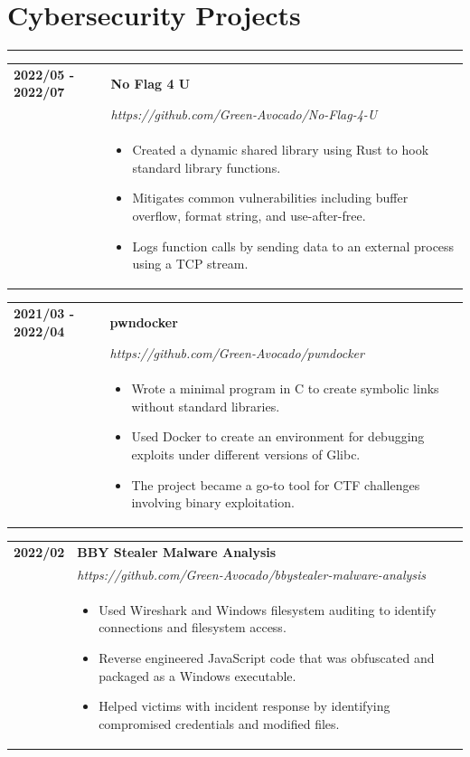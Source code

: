 \documentclass[letterpaper]{article}
\newcommand{\sectcolor}{cyan}
\newcommand{\sect}[1]{\section*{#1}
                        {\color{\sectcolor}
                        \rule{\textwidth}{1pt}
                        \vspace{-4pt}}}
\begin{document}
    \sect{Cybersecurity Projects}

        \begin{tabular}{p{} p{}}
            \textbf{2022/05 - 2022/07} & \textbf{No Flag 4 U} \\
            & \emph{https://github.com/Green-Avocado/No-Flag-4-U} \\
            & \begin{itemize}
                \item Created a dynamic shared library using Rust to hook standard library functions.
                \item Mitigates common vulnerabilities including buffer overflow, format string, and
                    use-after-free.
                \item Logs function calls by sending data to an external process using a TCP stream.
            \end{itemize}
        \end{tabular}

        \begin{tabular}{p{} p{}}
            \textbf{2021/03 - 2022/04} & \textbf{pwndocker} \\
            & \emph{https://github.com/Green-Avocado/pwndocker} \\
            & \begin{itemize}
                \item Wrote a minimal program in C to create symbolic links without standard libraries.
                \item Used Docker to create an environment for debugging exploits under different
                    versions of Glibc.
                \item The project became a go-to tool for CTF challenges involving binary exploitation.
            \end{itemize}
        \end{tabular}

        \begin{tabular}{p{} p{}}
            \textbf{2022/02} & \textbf{BBY Stealer Malware Analysis} \\
            & \emph{https://github.com/Green-Avocado/bbystealer-malware-analysis} \\
            & \begin{itemize}
                \item Used Wireshark and Windows filesystem auditing to identify connections and
                    filesystem access.
                \item Reverse engineered JavaScript code that was obfuscated and packaged as a Windows
                    executable.
                \item Helped victims with incident response by identifying compromised credentials and
                    modified files.
            \end{itemize}
        \end{tabular}
\end{document}
